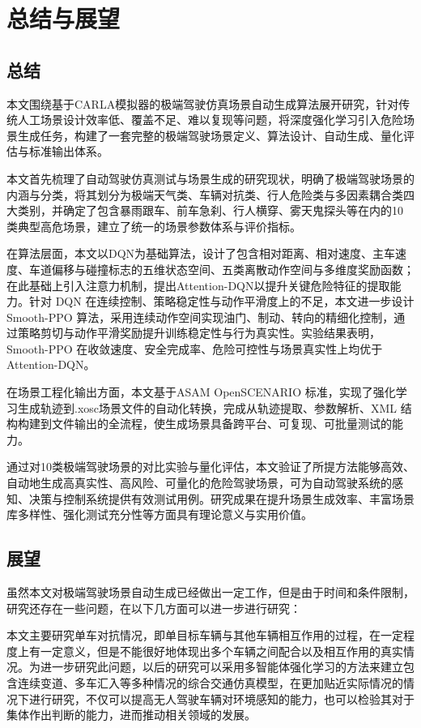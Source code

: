 
\chapter{总结与展望}

\section{总结}


本文围绕基于CARLA模拟器的极端驾驶仿真场景自动生成算法展开研究，针对传统人工场景设计效率低、覆盖不足、难以复现等问题，将深度强化学习引入危险场景生成任务，构建了一套完整的极端驾驶场景定义、算法设计、自动生成、量化评估与标准输出体系。

本文首先梳理了自动驾驶仿真测试与场景生成的研究现状，明确了极端驾驶场景的内涵与分类，将其划分为极端天气类、车辆对抗类、行人危险类与多因素耦合类四大类别，并确定了包含暴雨跟车、前车急刹、行人横穿、雾天鬼探头等在内的10 类典型高危场景，建立了统一的场景参数体系与评价指标。

在算法层面，本文以DQN为基础算法，设计了包含相对距离、相对速度、主车速度、车道偏移与碰撞标志的五维状态空间、五类离散动作空间与多维度奖励函数；在此基础上引入注意力机制，提出Attention-DQN以提升关键危险特征的提取能力。针对 DQN 在连续控制、策略稳定性与动作平滑度上的不足，本文进一步设计Smooth-PPO 算法，采用连续动作空间实现油门、制动、转向的精细化控制，通过策略剪切与动作平滑奖励提升训练稳定性与行为真实性。实验结果表明，Smooth-PPO 在收敛速度、安全完成率、危险可控性与场景真实性上均优于 Attention-DQN。

在场景工程化输出方面，本文基于ASAM OpenSCENARIO 标准，实现了强化学习生成轨迹到.xosc场景文件的自动化转换，完成从轨迹提取、参数解析、XML 结构构建到文件输出的全流程，使生成场景具备跨平台、可复现、可批量测试的能力。

通过对10类极端驾驶场景的对比实验与量化评估，本文验证了所提方法能够高效、自动地生成高真实性、高风险、可量化的危险驾驶场景，可为自动驾驶系统的感知、决策与控制系统提供有效测试用例。研究成果在提升场景生成效率、丰富场景库多样性、强化测试充分性等方面具有理论意义与实用价值。

\section{展望}


虽然本文对极端驾驶场景自动生成已经做出一定工作，但是由于时间和条件限制，研究还存在一些问题，在以下几方面可以进一步进行研究：

本文主要研究单车对抗情况，即单目标车辆与其他车辆相互作用的过程，在一定程度上有一定意义，但是不能很好地体现出多个车辆之间配合以及相互作用的真实情况。为进一步研究此问题，以后的研究可以采用多智能体强化学习的方法来建立包含连续变道、多车汇入等多种情况的综合交通仿真模型，在更加贴近实际情况的情况下进行研究，不仅可以提高无人驾驶车辆对环境感知的能力，也可以检验其对于集体作出判断的能力，进而推动相关领域的发展。

